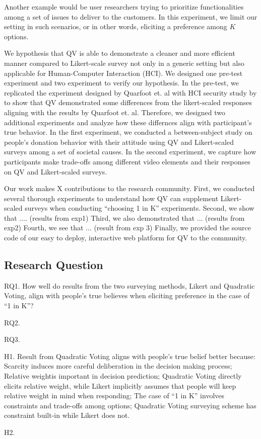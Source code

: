 Another example would be user researchers trying to prioritize functionalities
among a set of issues to deliver to the customers.
In this experiment, we limit our setting in such scenarios,
or in other words, eliciting a preference among $K$ options.

We hypothesis that 
QV is able to demonstrate a cleaner and more efficient manner 
compared to Likert-scale survey
not only in a generic setting
but also applicable for Human-Computer Interaction (HCI).
We designed one pre-test experiment and two experiment to verify our hypothesis.
In the pre-test,
we replicated the experiment designed by Quarfoot et. al \cite{quarfoot2017quadratic}
with HCI security study by \cite{leon2013matters} to show that
QV demonstrated some differences from the likert-scaled responses
aligning with the results by Quarfoot et. al.
Therefore, we designed two additional experiments
and analyze how these differnces align with participant's true behavior.
In the first experiment, 
we conducted a between-subject study
on people's donation behavior
with their attitude using QV and Likert-scaled surveys among a set of societal causes.
In the second experiment,
we capture how participants make trade-offs among different video elements
and their responses on QV and Likert-scaled surveys.

Our work makes X contributions to the research community. 
First, we conducted several thorough experiments 
to understand how QV can supplement Likert-scaled surveys
when conducting ``choosing 1 in K'' experiments.
Second, we show that .... (results from exp1)
Third, we also demonstrated that ... (results from exp2)
Fourth, we see that ... (result from exp 3)
Finally, we provided the source code of our easy to deploy, 
interactive web platform for QV to the community.


\subsection{Research Question}
RQ1. How well do results from the two surveying methods, Likert and Quadratic Voting, align with people’s true believes when eliciting preference in the case of ``1 in K''?

RQ2.

RQ3.


H1. Result from Quadratic Voting aligns with people’s true belief better because: Scarcity induces more careful deliberation in the decision making process; Relative weightis important in decision prediction; Quadratic Voting directly elicits relative weight, while Likert implicitly assumes that people will keep relative weight in mind when responding; The case of ``1 in K'' involves constraints and trade-offs  among options; Quadratic Voting surveying scheme has constraint built-in while Likert does not.

H2.